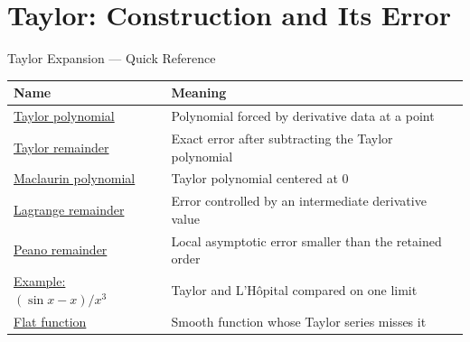 \section{Taylor: Construction and Its Error}

\begin{toolkitbox}{Taylor Expansion --- Quick Reference}
\small
\begin{tabular}{l l}
\toprule
\textbf{Name} & \textbf{Meaning} \\
\midrule
\hyperref[def:taylor-polynomial-at-a-point]{Taylor polynomial} & Polynomial forced by derivative data at a point \\
\hyperref[def:taylor-remainder]{Taylor remainder} & Exact error after subtracting the Taylor polynomial \\
\hyperref[def:maclaurin-polynomial]{Maclaurin polynomial} & Taylor polynomial centered at \(0\) \\
\hyperref[thm:taylor-theorem-lagrange-remainder]{Lagrange remainder} & Error controlled by an intermediate derivative value \\
\hyperref[cor:taylor-expansion-peano-remainder]{Peano remainder} & Local asymptotic error smaller than the retained order \\
\hyperref[ex:sinx-limit]{Example: \((\sin x-x)/x^3\)} & Taylor and L'H\^{o}pital compared on one limit \\
\hyperref[prop:flat-function]{Flat function} & Smooth function whose Taylor series misses it \\
\bottomrule
\end{tabular}
\end{toolkitbox}



